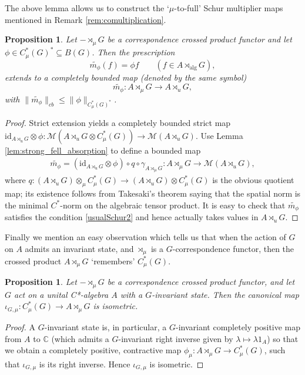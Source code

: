 \documentclass[12pt]{amsart}
\newtheorem{prop}[thm]{Proposition}
\theoremstyle{definition}
\theoremstyle{remark}
\numberwithin{equation}{section}
\begin{document}
The above lemma allows us to construct the `$\mu$-to-full' Schur multiplier maps mentioned in Remark \ref{rem:comultiplication}.


\begin{prop} \label{Schurrevisited}
   Let $-\rtimes_\mu G$ be a correspondence crossed product functor and let  $\phi \in C^*_\mu(G)^*\subseteq B(G)$. Then the prescription
\begin{equation}\label{usualSchur2}
\widetilde{m_\phi}( f) = \phi f\qquad(f \in 	A\rtimes_{\mathrm{alg}}G),
\end{equation}
extends to a completely bounded map (denoted by the same symbol)
\[
\widetilde{m_\phi}  \colon A\rtimes_\mu G
\to A\rtimes_u G,
\]
with $\|\widetilde{m_\phi}\|_{cb} \leq \|\phi\|_{C^*_\mu(G)^*}$.
\end{prop}

\begin{proof}
Strict extension yields a completely bounded strict map	$\mathrm{id}_{A\rtimes_u G }\otimes \phi \colon \mathcal{M}	(A\rtimes_u G  \otimes C^*_\mu(G)) \to
\mathcal{M}(A\rtimes_u G )$. Use Lemma \ref{lem:strong_fell_absorption} to define a bounded map
\begin{align*}
\widetilde{m_\phi} = (\mathrm{id}_{A\rtimes_u G }\otimes \phi) \circ q \circ  \gamma_{A\rtimes_\mu G } \colon A\rtimes_\mu G
\to \mathcal{M}(A\rtimes_u G ),
\end{align*}
where $q\colon(A\rtimes_u G)  \otimes_\mu C^*_\mu(G)\to (A\rtimes_u G)  \otimes C^*_\mu(G)$ is the obvious quotient map; its existence follows from Takesaki's theorem saying that the spatial norm is the minimal $C^*$-norm on the algebraic tensor product. It is easy to check that   $ \widetilde{m_\phi}$ satisfies the condition \eqref{usualSchur2} and hence actually takes values in $A\rtimes_u G$.
\end{proof}


Finally we mention an easy observation which tells us that when the action of $G$ on $A$ admits an invariant state, and $\rtimes_\mu$ is a $G$-correspondence functor, then the crossed product $A \rtimes_\mu G$ `remembers' $C^*_\mu(G)$.



\begin{prop}\label{invariantstate}
	Let $-\rtimes_\mu G$ be a correspondence crossed product functor, and let $G$ act on a unital C*-algebra $A$ with a $G$-invariant state.	Then the canonical map $\iota_{G,\mu}\colon C^*_\mu(G) \to A \rtimes_\mu G$ is isometric.
\end{prop}
\begin{proof}
A  $G$-invariant state is, in particular, a $G$-invariant completely positive map from $A$ to $\mathbb{C}$ (which admits a $G$-invariant right inverse given by $\lambda \mapsto \lambda 1_A$) so that we obtain a completely positive, contractive map $\phi_\mu\colon A \rtimes_\mu G \to 	C^*_\mu(G)$, such that $\iota_{G,\mu}$ is its right inverse. Hence $\iota_{G,\mu}$ is isometric.
\end{proof}
\end{document}
